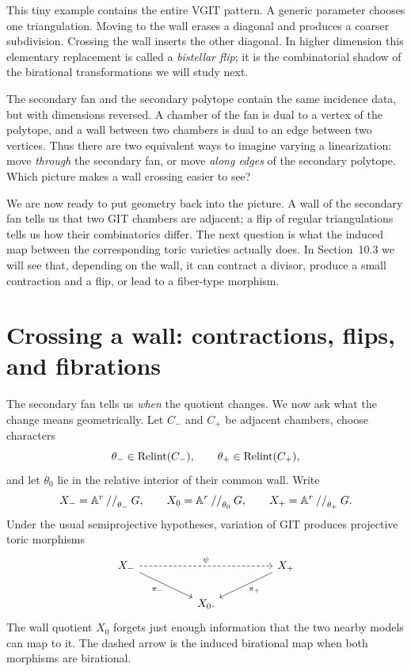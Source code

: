 This tiny example contains the entire VGIT pattern.  A generic
parameter chooses one triangulation.  Moving to the wall erases a
diagonal and produces a coarser subdivision.  Crossing the wall inserts
the other diagonal.  In higher dimension this elementary replacement
is called a \emph{bistellar flip}; it is the combinatorial shadow of the
birational transformations we will study next.

\begin{pauseandthink}
The secondary fan and the secondary polytope contain the same
incidence data, but with dimensions reversed.  A chamber of the fan is
dual to a vertex of the polytope, and a wall between two chambers is
dual to an edge between two vertices.  Thus there are two equivalent
ways to imagine varying a linearization: move \emph{through} the
secondary fan, or move \emph{along edges} of the secondary polytope.
Which picture makes a wall crossing easier to see?
\end{pauseandthink}

We are now ready to put geometry back into the picture.  A wall of the
secondary fan tells us that two GIT chambers are adjacent; a flip of
regular triangulations tells us how their combinatorics differ.  The
next question is what the induced map between the corresponding toric
varieties actually does.  In Section~10.3 we will see that, depending
on the wall, it can contract a divisor, produce a small contraction and
a flip, or lead to a fiber-type morphism.

\section{Crossing a wall: contractions, flips, and fibrations}
\label{sec:crossing-wall}

The secondary fan tells us \emph{when} the quotient changes.  We now
ask what the change means geometrically.  Let \(C_-\) and \(C_+\) be
adjacent chambers, choose characters
\[
\theta_-\in\operatorname{Relint}(C_-),
\qquad
\theta_+\in\operatorname{Relint}(C_+),
\]
and let \(\theta_0\) lie in the relative interior of their common wall.
Write
\[
X_-
=
\mathbb{A}^r\mathbin{//}_{\theta_-}G,
\qquad
X_0
=
\mathbb{A}^r\mathbin{//}_{\theta_0}G,
\qquad
X_+
=
\mathbb{A}^r\mathbin{//}_{\theta_+}G.
\]
Under the usual semiprojective hypotheses, variation of GIT produces
projective toric morphisms
\[
\begin{tikzcd}[column sep=huge]
X_-
  \arrow[dr,"\pi_-"']
  \arrow[rr,dashed,"\psi"]
&&
X_+
  \arrow[dl,"\pi_+"]
\\
&X_0.&
\end{tikzcd}
\]
The wall quotient \(X_0\) forgets just enough information that the two
nearby models can map to it.  The dashed arrow is the induced
birational map when both morphisms are birational.

